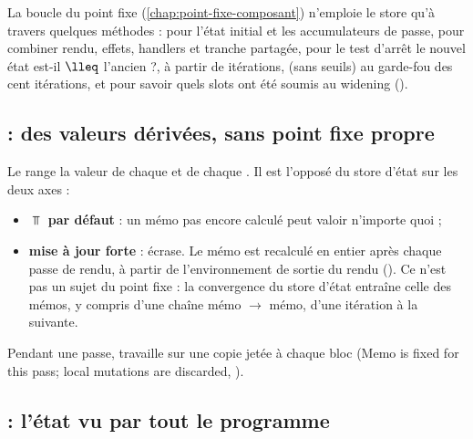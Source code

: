 La boucle du point fixe (\cref{chap:point-fixe-composant}) n'emploie le store
qu'à travers quelques méthodes :  pour l'état initial et les
accumulateurs de passe,  pour combiner rendu, effets, handlers et
tranche partagée,  pour le test d'arrêt \og le nouvel état est-il
$\lleq$ l'ancien ?\fg{},  à partir de
 itérations,  (sans seuils) au garde-fou
des cent itérations, et  pour savoir quels slots ont été
soumis au widening ().

\subsection{ : des valeurs dérivées, sans point fixe propre}


Le  range la valeur de chaque  et de chaque
. Il est l'opposé du store d'état sur les deux axes :
\begin{itemize}
  \item \textbf{$\Top$ par défaut} : un mémo pas encore calculé peut valoir
    n'importe quoi ;
  \item \textbf{mise à jour forte} :  écrase. Le mémo est recalculé
    en entier après chaque passe de rendu, à partir de l'environnement de
    sortie du rendu (). Ce n'est pas un
    sujet du point fixe : la convergence du store d'état entraîne celle des
    mémos, y compris d'une chaîne mémo $\to$ mémo, d'une itération à la
    suivante.
\end{itemize}
Pendant une passe,  travaille sur une copie jetée à chaque
bloc (\og Memo is fixed for this pass; local mutations are discarded\fg{},
).

\subsection{ : l'état vu par tout le programme}


